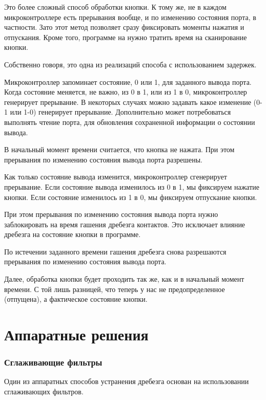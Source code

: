 \documentclass{altsu-report}
\begin{document}
Это более сложный способ обработки кнопки. К тому же, не в каждом микроконтроллере есть прерывания вообще, и по изменению состояния порта, в частности. Зато этот метод позволяет сразу фиксировать моменты нажатия и отпускания. Кроме того, программе на нужно тратить время на сканирование кнопки.

Собственно говоря, это одна из реализаций способа с использованием задержек.

Микроконтроллер запоминает состояние, 0 или 1, для заданного вывода порта. Когда состояние меняется, не важно, из 0 в 1, или из 1 в 0, микроконтроллер генерирует прерывание. В некоторых случаях можно задавать какое изменение (0-1 или 1-0) генерирует прерывание. Дополнительно может потребоваться выполнять чтение порта, для обновления сохраненной информации о состоянии вывода.

В начальный момент времени считается, что кнопка не нажата. При этом прерывания по изменению состояния вывода порта разрешены.

Как только состояние вывода изменится, микроконтроллер сгенерирует прерывание. Если состояние вывода изменилось из 0 в 1, мы фиксируем нажатие кнопки. Если состояние изменилось из 1 в 0, мы фиксируем отпускание кнопки.

При этом прерывания по изменению состояния вывода порта нужно заблокировать на время гашения дребезга контактов. Это исключает влияние дребезга на состояние кнопки в программе.

По истечении заданного времени гашения дребезга снова разрешаются прерывания по изменению состояния вывода порта.

Далее, обработка кнопки будет проходить так же, как и в начальный момент времени. С той лишь разницей, что теперь у нас не предопределенное (отпущена), а фактическое состояние кнопки.

\section*{Аппаратные решения}

\subsubsection*{Сглаживающие фильтры}

Один из аппаратных способов устранения дребезга основан на использовании сглаживающих фильтров.
\end{document}
